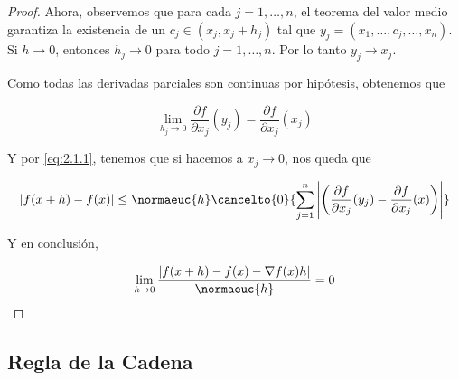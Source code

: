 \begin{proof}
    Ahora, observemos que para cada $j = 1, \dots, n$, el teorema del valor medio garantiza la existencia de un $c_j \in (x_j, x_j + h_j)$ tal que $y_j = (x_1, \dots, c_j, \dots, x_n)$. Si $h \to 0$, entonces $h_j \to 0$ para todo $j = 1, \dots, n$. Por lo tanto $y_j \to x_j$.
    
    Como todas las derivadas parciales son continuas por hipótesis, obtenemos que
    
    \[
    \lim_{h_j \to 0} \frac{\partial f}{\partial x_j} (y_j) = \frac{\partial f}{\partial x_j} (x_j)
    \]
    
    Y por \ref{eq:2.1.1}, tenemos que si hacemos a $x_j \to 0$, nos queda que
    
    \[
    \left| f(x + h) - f(x) \right| \leq \normaeuc{h} \cancelto{0}{\sum_{j=1}^n \Bigg| \bigg( \frac{\partial f}{\partial x_j} (y_j) - \frac{\partial f}{\partial x_j} (x) \bigg) \Bigg|}
    \]
    
    Y en conclusión,
    
    \[
    \lim_{h \to 0} \frac{\left| f(x + h) - f(x) - \nabla f(x) h \right|}{\normaeuc{h}} = 0
    \]
\end{proof}

\subsection{Regla de la Cadena}
